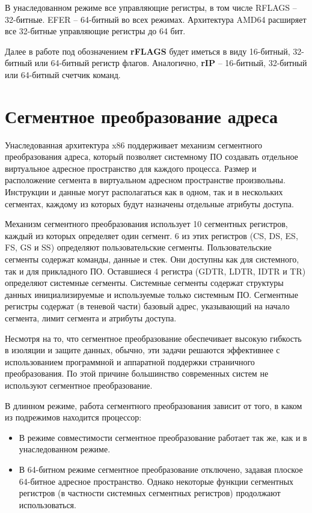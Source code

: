 В унаследованном режиме все управляющие регистры, в том числе RFLAGS -- 32-битные. EFER -- 64-битный во всех режимах.
Архитектура AMD64 расширяет все 32-битные управляющие регистры до 64 бит.

Далее в работе под обозначением \textbf{rFLAGS} будет иметься в виду 16-битный, 32-битный или
64-битный регистр флагов. Аналогично, \textbf{rIP} -- 16-битный, 32-битный или 64-битный счетчик команд.


\section{Сегментное преобразование адреса}
Унаследованная архитектура x86 поддерживает механизм сегментного преобразования адреса, который
позволяет системному ПО создавать отдельное виртуальное адресное пространство для каждого процесса.
Размер и расположение сегмента в виртуальном адресном пространстве произвольны. Инструкции и данные
могут располагаться как в одном, так и в нескольких сегментах, каждому из которых будут назначены
отдельные атрибуты доступа.

Механизм сегментного преобразования использует 10 сегментных регистров, каждый из которых
определяет один сегмент. 6 из этих регистров (CS, DS, ES, FS, GS и SS) определяют пользовательские сегменты.
Пользовательские сегменты содержат команды, данные и стек. Они доступны как для системного, так и для прикладного ПО.
Оставшиеся 4 регистра (GDTR, LDTR, IDTR и TR) определяют системные сегменты. Системные сегменты содержат структуры
данных инициализируемые и используемые только системным ПО. Сегментные регистры содержат (в теневой части)
базовый адрес, указывающий на начало сегмента, лимит сегмента и атрибуты доступа.

Несмотря на то, что сегментное преобразование обеспечивает высокую гибкость в изоляции и защите данных,
обычно, эти задачи решаются эффективнее с использованием программной и аппаратной
поддержки страничного преобразования. По этой причине большинство современных систем не используют
сегментное преобразование.

В длинном режиме, работа сегментного преобразования зависит от того, в каком из подрежимов находится процессор:
\begin{itemize}
\item В режиме совместимости сегментное преобразование работает так же, как и в унаследованном режиме.
\item В 64-битном режиме сегментное преобразование отключено, задавая плоское 64-битное адресное пространство.
	Однако некоторые функции сегментных регистров (в частности системных сегментных регистров) продолжают использоваться.
\end{itemize}

